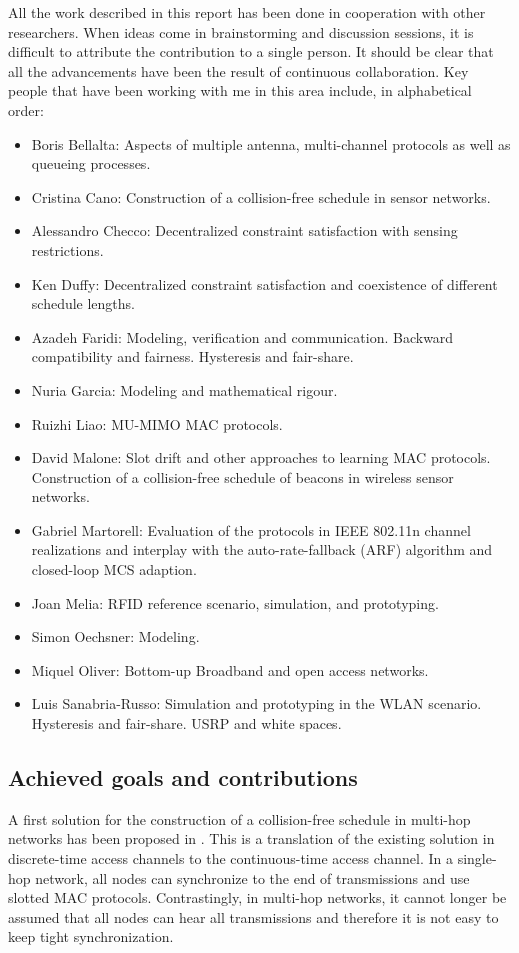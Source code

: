 \documentclass[a4paper,twocolumns]{article}%
\begin{document}
All the work described in this report has been done in cooperation with other researchers.
When ideas come in brainstorming and discussion sessions, it is difficult to attribute the contribution to a single person.
It should be clear that all the advancements have been the result of continuous collaboration.
Key people that have been working with me in this area include, in alphabetical order:
\begin{itemize}
\item Boris Bellalta: Aspects of multiple antenna, multi-channel protocols as well as queueing processes.
\item Cristina Cano: Construction of a collision-free schedule in sensor networks.
\item Alessandro Checco: Decentralized constraint satisfaction with sensing restrictions.
\item Ken Duffy: Decentralized constraint satisfaction and coexistence of different schedule lengths.
\item Azadeh Faridi: Modeling, verification and communication. Backward compatibility and fairness. Hysteresis and fair-share.
\item Nuria Garcia: Modeling and mathematical rigour.
\item Ruizhi Liao: MU-MIMO MAC protocols.
\item David Malone: Slot drift and other approaches to learning MAC protocols. Construction of a collision-free schedule of beacons in wireless sensor networks.
\item Gabriel Martorell: Evaluation of the protocols in IEEE 802.11n channel realizations and interplay with the auto-rate-fallback (ARF) algorithm and closed-loop MCS adaption.
\item Joan Melia: RFID reference scenario, simulation, and prototyping.
\item Simon Oechsner: Modeling.
\item Miquel Oliver: Bottom-up Broadband and open access networks.
\item Luis Sanabria-Russo: Simulation and prototyping in the WLAN scenario. Hysteresis and fair-share. USRP and white spaces.
\end{itemize}

\subsection{Achieved goals and contributions}

A first solution for the construction of a collision-free schedule in multi-hop networks has been proposed in \cite{barcelo2013dcc}.
This is a translation of the existing solution in discrete-time access channels to the continuous-time access channel.
In a single-hop network, all nodes can synchronize to the end of transmissions and use slotted MAC protocols.
Contrastingly, in multi-hop networks, it cannot longer be assumed that all nodes can hear all transmissions and therefore it is not easy to keep tight synchronization.
\end{document}
